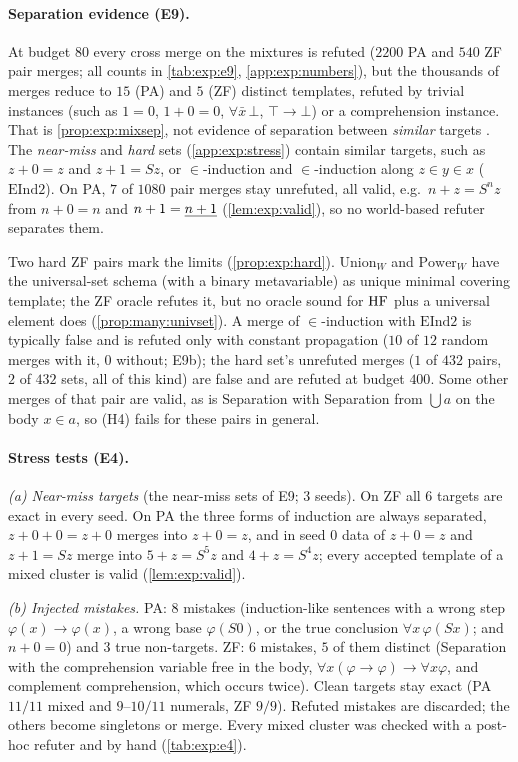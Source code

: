 \paragraph{Separation evidence (E9).}
At budget $80$ every cross merge on the mixtures is refuted ($2200$ PA and $540$ ZF pair merges; all counts in \cref{tab:exp:e9}, \cref{app:exp:numbers}), but the thousands of merges reduce to $15$ (PA) and $5$ (ZF) distinct templates, refuted by trivial instances (such as $1=0$, $1+0=0$, $\forall\bar x\,\bot$, $\top\to\bot$) or a comprehension instance. That is \cref{prop:exp:mixsep}, not evidence of separation between \emph{similar} targets . The \emph{near-miss} and \emph{hard} sets (\cref{app:exp:stress}) contain similar targets, such as $z+0=z$ and $z+1=Sz$, or $\in$-induction and $\in$-induction along $z\in y\in x$ ($\mathrm{EInd2}$). On PA, $7$ of $1080$ pair merges stay unrefuted, all valid, e.g.\ $n+z=S^nz$ from $n+0=n$ and $n+1=\underline{n+1}$ (\cref{lem:exp:valid}), so no world-based refuter separates them.

Two hard ZF pairs mark the limits (\cref{prop:exp:hard}). $\mathrm{Union}_W$ and $\mathrm{Power}_W$ have the universal-set schema (with a binary metavariable) as unique minimal covering template; the ZF oracle refutes it, but no oracle sound for $\mathrm{HF}$ plus a universal element does (\cref{prop:many:univset}). A merge of $\in$-induction with $\mathrm{EInd2}$ is typically false and is refuted only with constant propagation ($10$ of $12$ random merges with it, $0$ without; E9b); the hard set's unrefuted merges ($1$ of $432$ pairs, $2$ of $432$ sets, all of this kind) are false and are refuted at budget $400$. Some other merges of that pair are valid, as is Separation with Separation from $\bigcup a$ on the body $x\in a$, so (H4) fails for these pairs in general.

\paragraph{Stress tests (E4).}
\emph{(a) Near-miss targets} (the near-miss sets of E9; 3 seeds). On ZF all $6$ targets are exact in every seed. On PA the three forms of induction are always separated, $z+0+0=z+0$ merges into $z+0=z$, and in seed $0$ data of $z+0=z$ and $z+1=Sz$ merge into $5+z=S^5z$ and $4+z=S^4z$; every accepted template of a mixed cluster is valid (\cref{lem:exp:valid}).

\emph{(b) Injected mistakes.} PA: $8$ mistakes (induction-like sentences with a wrong step $\varphi(x)\to\varphi(x)$, a wrong base $\varphi(S0)$, or the true conclusion $\forall x\,\varphi(Sx)$; and $n+0=0$) and $3$ true non-targets. ZF: $6$ mistakes, $5$ of them distinct (Separation with the comprehension variable free in the body, $\forall x(\varphi\to\varphi)\to\forall x\varphi$, and complement comprehension, which occurs twice). Clean targets stay exact (PA $11/11$ mixed and $9$--$10/11$ numerals, ZF $9/9$). Refuted mistakes are discarded; the others become singletons or merge. Every mixed cluster was checked with a post-hoc refuter and by hand (\cref{tab:exp:e4}).

